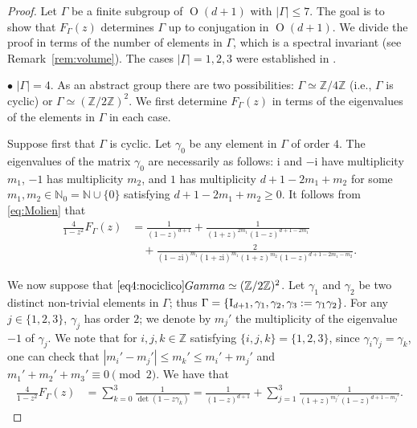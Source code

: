 \documentclass[12pt,a4paper,final]{amsart}
\theoremstyle{plain}
\theoremstyle{definition}
\theoremstyle{remark}
\numberwithin{equation}{section}
\newcommand{\N}{\mathbb N}
\newcommand{\Z}{\mathbb Z}
\DeclareMathOperator{\Ot}{O}
\newcommand{\Id}{\textup{I}}
\newcommand{\mi}{\mathrm{i}}
\begin{document}
\begin{proof}
Let $\Gamma$ be a finite subgroup of $\Ot(d+1)$ with $|\Gamma|\leq 7$. 
The goal is to show that $F_{\Gamma}(z)$ determines $\Gamma$ up to conjugation in $\Ot(d+1)$. 
We divide the proof in terms of the number of elements in $\Gamma$, which is a spectral invariant (see Remark~\ref{rem:volume}). 
The cases $|\Gamma|=1,2,3$ were established in \cite[Prop.~4.1]{LauretLinowitz}.


\medskip\noindent$\bullet$
$|\Gamma|=4$. 
As an abstract group there are two possibilities:  $\Gamma\simeq\Z/4\Z$ (i.e., $\Gamma$ is cyclic) or $\Gamma\simeq(\Z/2\Z)^2$. 
We first determine $F_{\Gamma}(z)$ in terms of the eigenvalues of the elements in $\Gamma$ in each case. 

Suppose first that $\Gamma$ is cyclic. 
Let $\gamma_0$ be any element in $\Gamma$ of order $4$. 
The eigenvalues of the matrix $\gamma_0$ are necessarily as follows:
$\mi$ and $-\mi$ have multiplicity $m_1$,
$-1$ has multiplicity $m_2$, 
and $1$ has multiplicity $d+1-2m_1+m_2$ for some $m_1,m_2\in\N_0=\N\cup\{0\}$ satisfying $d+1-2m_1+m_2\geq0$. 
It follows from \eqref{eq:Molien} that 
\begin{equation}\label{eq4:ciclico}
\begin{aligned}
\frac{4}{1-z^2}F_{\Gamma}(z)&
= \frac{1}{(1-z)^{d+1}}
+\frac{1}{(1+z)^{2m_1}(1-z)^{d+1-2m_1}}
\\ & \quad
+\frac{2}{(1-z\mi)^{m_1} (1+z\mi)^{m_1} (1+z)^{m_2} (1-z)^{d+1-2m_1-m_2}}
.
\end{aligned}
\end{equation}

We now suppose that $\ref{eq4:nociclico}Gamma\simeq(\Z/2\Z)^2$. 
Let $\gamma_1$ and $\gamma_2$ be two distinct non-trivial elements in $\Gamma$; thus $\Gamma=\{\Id_{d+1},\gamma_1,\gamma_2,\gamma_3:=\gamma_1\gamma_2\}$. 
For any $j\in\{1,2,3\}$, $\gamma_j$ has order $2$; we denote by $m_j'$ the multiplicity of the eigenvalue $-1$ of $\gamma_j$. 
We note that for $i,j,k\in\Z$ satisfying $\{i,j,k\}=\{1,2,3\}$, since $\gamma_i\gamma_j=\gamma_k$, one can check that $|m_i'-m_j'|\leq m_k'\leq m_i'+m_j'$ and $m_1'+m_2'+m_3'\equiv0\pmod 2$.
We have that
\begin{equation}\label{eq4:nociclico}
\begin{aligned}
\frac{4}{1-z^2}F_{\Gamma}(z)&
= \sum_{k=0}^3 \frac{1}{\det(1-z\gamma_k)}
= \frac{1}{(1-z)^{d+1}}
+\sum_{j=1}^3 \frac{1}{(1+z)^{m_j'}(1-z)^{d+1-m_j'}}
.
\end{aligned}
\end{equation}


\end{proof}
\end{document}
